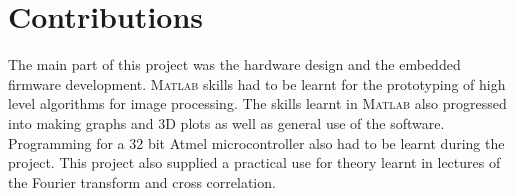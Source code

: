 \section{Contributions}
The main part of this project was the hardware design and the embedded firmware development. \textsc{Matlab} skills had to be learnt for the prototyping of high level algorithms for image processing. The skills learnt in \textsc{Matlab} also progressed into making graphs and 3D plots as well as general use of the software. Programming for a 32 bit Atmel microcontroller also had to be learnt during the project. This project also supplied a practical use for theory learnt in lectures of the Fourier transform and cross correlation. 

